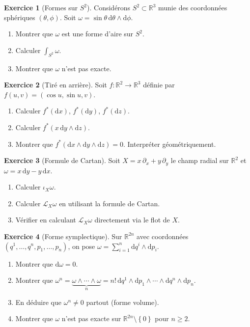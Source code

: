 \documentclass[12pt,a4paper,openany]{book}
\theoremstyle{definition}
\newtheorem{exercice}{Exercice}[chapter]
\theoremstyle{plain}
\theoremstyle{remark}
\newcommand{\R}{\mathbb{R}}
\newcommand{\dd}{\mathrm{d}}
\newcommand{\set}[1]{\left\{#1\right\}}
\begin{document}
\begin{exercice}[Formes sur $S^2$]\label{exo:formes-S2}
Considérons $S^2 \subset \R^3$ munie des coordonnées sphériques
$(\theta, \phi)$. Soit $\omega = \sin\theta\, \dd\theta \wedge \dd\phi$.
\begin{enumerate}[label=\textup{(\alph*)}]
  \item Montrer que $\omega$ est une forme d'aire sur $S^2$.
  \item Calculer $\int_{S^2} \omega$.
  \item Montrer que $\omega$ n'est pas exacte.
\end{enumerate}
\end{exercice}

\begin{exercice}[Tiré en arrière]\label{exo:tire-en-arriere}
Soit $f \colon \R^2 \to \R^3$ définie par
$f(u,v) = (\cos u, \sin u, v)$.
\begin{enumerate}[label=\textup{(\alph*)}]
  \item Calculer $f^*(\dd x)$, $f^*(\dd y)$, $f^*(\dd z)$.
  \item Calculer $f^*(x\,\dd y \wedge \dd z)$.
  \item Montrer que $f^*(\dd x \wedge \dd y \wedge \dd z) = 0$.
    Interpréter géométriquement.
\end{enumerate}
\end{exercice}

\begin{exercice}[Formule de Cartan]\label{exo:formule-cartan}
Soit $X = x\,\partial_x + y\,\partial_y$ le champ radial sur $\R^2$ et
$\omega = x\,\dd y - y\,\dd x$.
\begin{enumerate}[label=\textup{(\alph*)}]
  \item Calculer $\iota_X \omega$.
  \item Calculer $\mathcal{L}_X \omega$ en utilisant la formule de Cartan.
  \item Vérifier en calculant $\mathcal{L}_X \omega$ directement via le
    flot de $X$.
\end{enumerate}
\end{exercice}

\begin{exercice}[Forme symplectique]\label{exo:forme-symplectique}%
Sur $\R^{2n}$ avec coordonnées $(q^1, \ldots, q^n, p_1, \ldots, p_n)$,
on pose $\omega = \sum_{i=1}^n \dd q^i \wedge \dd p_i$.
\begin{enumerate}[label=\textup{(\alph*)}]
  \item Montrer que $\dd\omega = 0$.
  \item Montrer que $\omega^n = \underbrace{\omega \wedge \cdots
    \wedge \omega}_n = n!\, \dd q^1 \wedge \dd p_1 \wedge \cdots
    \wedge \dd q^n \wedge \dd p_n$.
  \item En déduire que $\omega^n \neq 0$ partout (forme volume).
  \item Montrer que $\omega$ n'est pas exacte sur $\R^{2n} \setminus
    \set{0}$ pour $n \geq 2$.
\end{enumerate}
\end{exercice}
\end{document}
